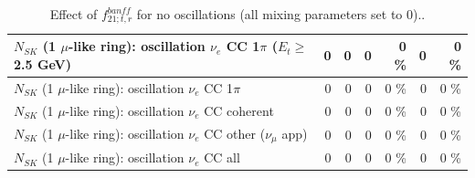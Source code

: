 \begin{table}
\begin{tabular}{| l | r | r | r  r | r  r |}
$N_{SK}$ (1 $\mu$-like ring): oscillation $\nu_e$ CC 1$\pi$ ($E_{t} \geq$ 2.5 GeV) &               0 &               0 &               0 &        0 \%  &               0 &        0 \%  \\ 
\hline
                     $N_{SK}$ (1 $\mu$-like ring): oscillation $\nu_e$ CC 1$\pi$ &               0 &               0 &               0 &        0 \%  &               0 &        0 \%  \\ 
                   $N_{SK}$ (1 $\mu$-like ring): oscillation $\nu_e$ CC coherent &               0 &               0 &               0 &        0 \%  &               0 &        0 \%  \\ 
      $N_{SK}$ (1 $\mu$-like ring): oscillation $\nu_e$ CC other ($\nu_\mu$ app) &               0 &               0 &               0 &        0 \%  &               0 &        0 \%  \\ 
                       $N_{SK}$ (1 $\mu$-like ring): oscillation $\nu_e$  CC all &               0 &               0 &               0 &        0 \%  &               0 &        0 \%  \\ 
\hline
\hline
\end{tabular}
\caption{ Effect of $f_{21; t, r}^{banff}$ for no oscillations (all mixing parameters set to 0).. }
\label{tab:num_banff_cc1piE0_1RmuT_3f_osc_t13:0}
\end{table}
\clearpage

